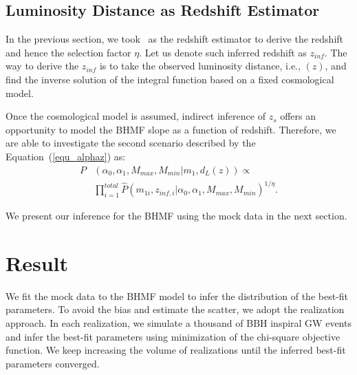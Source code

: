 \documentclass[twocolumn]{aastex62}
\begin{document}
\subsection{Luminosity Distance as Redshift Estimator} 
\label{sec_dl_z}
In the previous section, we took \dl\ as the redshift estimator to derive the redshift and hence the selection factor $\eta$. Let us denote such inferred redshift as $z_{inf}$. The way to derive the $z_{inf}$ is to take the observed luminosity distance, i.e.,  \dl$(z)$, and find the inverse solution of the integral function based on a fixed cosmological model.

Once the cosmological model is assumed, indirect inference of $z_s$ offers an opportunity to model the BHMF slope as a function of redshift. Therefore, we are able to investigate the second scenario described by the Equation~(\ref{equ_alphaz}) as:
 \begin{equation} \label{equ_lik_alphaz}
 \begin{split}
 P&(\alpha_0, \alpha_1, M_{max}, M_{min}|m_{1},d_L(z)) \propto \\
  &\prod_{i=1}^{total} \hat{P}(m_{1i}, z_{inf,i} |\alpha_0, \alpha_1, M_{max}, M_{min})^{1/\eta}.
  \end{split}
 \end{equation}
 
 We present our inference for the BHMF using the mock data in the next section. 


\vspace{1cm}
\section{Result}\label{sec_result}
We fit the mock data to the BHMF model to infer the distribution of the best-fit parameters. To avoid the bias and estimate the scatter, we adopt the realization approach. In each realization, we simulate a thousand of BBH inspiral GW events and infer the best-fit parameters using minimization of the chi-square objective function. We keep increasing the volume of realizations until the inferred best-fit parameters converged.
\end{document}

